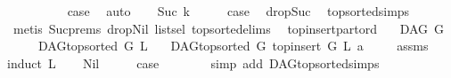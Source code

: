 \begin{isabellebody}
\ \ \isamarkupfalse%
\ {}\isanewline
\ \ \isamarkupfalse%
\ \isamarkupfalse%
\ {\isacharquery}{\kern0pt}case\ \isamarkupfalse%
\ auto\isanewline
{}\isamarkupfalse%
\isanewline
\ \ \isamarkupfalse%
\ {\isacharparenleft}{\kern0pt}Suc\ k{\isacharparenright}{\kern0pt}\isanewline
\ \ \isamarkupfalse%
\ \isamarkupfalse%
\ {\isacharquery}{\kern0pt}case\ \isamarkupfalse%
\ drop{\isacharunderscore}{\kern0pt}Suc\ \isamarkupfalse%
\ top{\isacharunderscore}{\kern0pt}sorted{\isachardot}{\kern0pt}simps\isanewline
\ \ \ \ \isamarkupfalse%
\ {\isacharparenleft}{\kern0pt}metis\ Suc{\isachardot}{\kern0pt}prems{\isacharparenleft}{\kern0pt}{}{\isacharparenright}{\kern0pt}\ drop{\isacharunderscore}{\kern0pt}Nil\ list{\isachardot}{\kern0pt}sel{\isacharparenleft}{\kern0pt}{}{\isacharparenright}{\kern0pt}\ top{\isacharunderscore}{\kern0pt}sorted{\isachardot}{\kern0pt}elims{\isacharparenleft}{\kern0pt}{}{\isacharparenright}{\kern0pt}{\isacharparenright}{\kern0pt}\ \isanewline
{}\isamarkupfalse%
%
\endisatagproof
{\isafoldproof}%
%
\isadelimproof
\isanewline
%
\endisadelimproof
\isanewline
\isanewline
{}\isamarkupfalse%
\ top{\isacharunderscore}{\kern0pt}insert{\isacharunderscore}{\kern0pt}part{\isacharunderscore}{\kern0pt}ord{\isacharcolon}{\kern0pt}\isanewline
\ \ \ {\isachardoublequoteopen}DAG\ G{\isachardoublequoteclose}\isanewline
\ \ \ \ \ {\isachardoublequoteopen}DAG{\isachardot}{\kern0pt}top{\isacharunderscore}{\kern0pt}sorted\ G\ L{\isachardoublequoteclose}\isanewline
\ \ \ {\isachardoublequoteopen}DAG{\isachardot}{\kern0pt}top{\isacharunderscore}{\kern0pt}sorted\ G\ {\isacharparenleft}{\kern0pt}top{\isacharunderscore}{\kern0pt}insert\ G\ L\ a{\isacharparenright}{\kern0pt}{\isachardoublequoteclose}\ \isanewline
%
\isadelimproof
\ \ %
\endisadelimproof
%
\isatagproof
{}\isamarkupfalse%
\ assms\ \isanewline
{}\isamarkupfalse%
{\isacharparenleft}{\kern0pt}induct\ L{\isacharparenright}{\kern0pt}\isanewline
\ \ \isamarkupfalse%
\ Nil\isanewline
\ \ \isamarkupfalse%
\ \isamarkupfalse%
\ {\isacharquery}{\kern0pt}case\ \ \isanewline
\ \ \ \ \isamarkupfalse%
\ {\isacharparenleft}{\kern0pt}simp\ add{\isacharcolon}{\kern0pt}\ DAG{\isachardot}{\kern0pt}top{\isacharunderscore}{\kern0pt}sorted{\isachardot}{\kern0pt}simps{\isacharparenright}{\kern0pt}\ \ \isanewline

\end{isabellebody}
